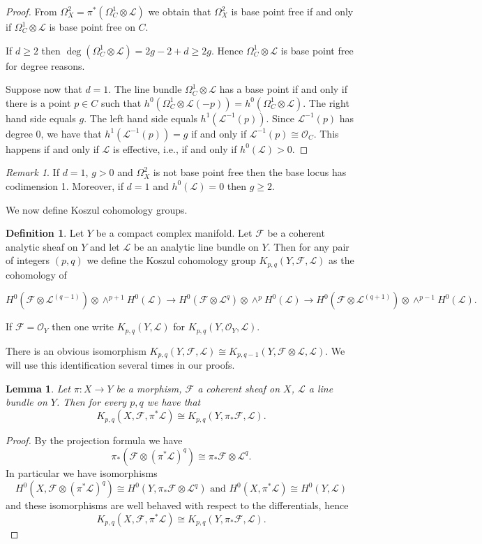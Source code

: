 \documentclass{amsart}
\newcommand{\cL}{\mathcal{L}}
\newcommand{\cF}{\mathcal{F}}
\newcommand{\cO}{\mathcal{O}}
\newtheorem{lemma}[theorem]{Lemma}
\theoremstyle{definition}
\newtheorem{definition}[theorem]{Definition}
\theoremstyle{remark}
\newtheorem{remark}[theorem]{Remark}
\begin{document}
\begin{proof} From $ \Omega^2_X=\pi^*(\Omega^1_C\otimes \cL)$ we obtain that $\Omega^2_X$ is base point free if and only if $\Omega^1_C\otimes \cL$ is base point free on $C$.

If $d\geq 2$ then $\deg(\Omega^1_C\otimes \cL)=2g-2+d\geq 2g$. Hence $\Omega^1_C\otimes\cL$ is  base point free for degree reasons.

Suppose now that $d=1$. 
The line bundle  $\Omega^1_C\otimes \cL$ has a base point if and only if there is a point $p\in C$ such that $h^0(\Omega^1_C \otimes \cL(-p))=h^0(\Omega^1_C \otimes \cL)$.
The right hand side equals $g$. The left hand side equals $h^1(\cL^{-1}(p))$. Since $\cL^{-1}(p)$ has degree 0, we have that $h^1(\cL^{-1}(p))=g$  if and only if $\cL^{-1}(p)\cong \cO_C$. This happens if and only if  $\cL$ is effective, i.e., if and only if $h^0(\cL)>0$. \end{proof}
\begin{remark}\label{remBps} If $d=1$, $g>0$  and $\Omega^2_X$ is not base point free then the base locus has codimension 1.
Moreover, if  $d=1$ and $h^0(\cL)=0$ then $g\geq 2$. 
\end{remark}



We now define Koszul cohomology groups.
\begin{definition}
Let $Y$ be a compact complex manifold.  Let $\cF$ be a coherent analytic sheaf on $Y$ and let $\cL$ be an analytic line bundle on $Y$. Then for any pair of integers $(p,q)$ we define the Koszul cohomology group $K_{p,q}(Y,\cF,\cL)$ as the cohomology of
\begin{small}
\[ H^0(\cF\otimes \cL^{ (q-1)}) \otimes \wedge^{p+1} H^0(\cL) \to H^0(\cF\otimes \cL^{ q}) \otimes  \wedge^p H^0(\cL) \to H^0(\cF\otimes \cL^{ (q+1)}) \otimes \wedge^{p-1} H^0(\cL).\]
\end{small}
If $\cF=\cO_Y$ then one write $K_{p,q}(Y,\cL)$ for $K_{p,q}(Y,\cO_Y,\cL)$.
\end{definition}

There is an obvious isomorphism $K_{p,q}(Y,\cF,\cL)\cong K_{p,q-1}(Y,\cF\otimes \cL,\cL)$. We will use this identification several times in our proofs.


\begin{lemma}\label{lemMor}
 Let $\pi:X\to Y$ be a morphism, $\cF$ a coherent sheaf on $X$, $\cL$ a line bundle on $Y$. Then for every $p,q$ we have that
\[ K_{p,q}(X,\cF,\pi^*\cL)\cong K_{p,q}(Y,\pi_*\cF,\cL).\]
\end{lemma} 
\begin{proof} By the projection formula we have
\[ \pi_*(\cF\otimes (\pi^*\cL)^q)\cong \pi_*\cF \otimes \cL^q.\]
In particular we have isomorphisms
\[ H^0(X,\cF\otimes (\pi^*\cL)^q) \cong H^0 (Y,\pi_*\cF \otimes \cL^q)
\mbox{ and } H^0(X,\pi^*\cL)\cong H^0(Y,\cL)\]
 and these isomorphisms are well behaved with respect to the differentials, hence
 \[ K_{p,q}(X,\cF,\pi^*\cL)\cong K_{p,q}(Y,\pi_*\cF, \cL).\]
\end{proof}
\end{document}
